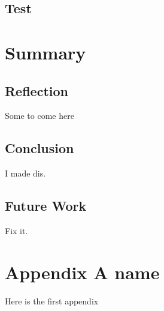 \section{Test}



\chapter{Summary}
\section{Reflection}
Some to come here
\section{Conclusion}
I made dis.
\section{Future Work}
Fix it.

\printbibliography[heading=bibintoc]
\label{bib:mybiblio}

\appendix
\chapter{Appendix A name}\label{ch:appAlabel}
Here is the first appendix

